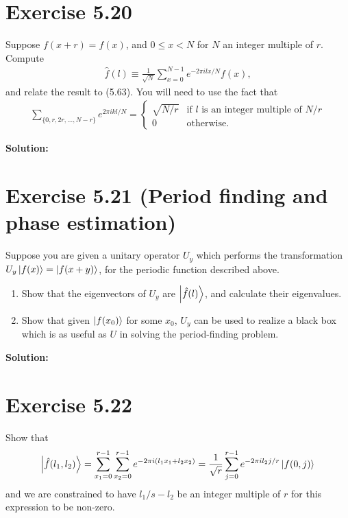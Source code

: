 \documentclass{book}
\begin{document}
\section*{Exercise 5.20}
    Suppose $f(x+r) = f(x)$, and $0\leq x<N$ for $N$ an integer multiple of $r$. Compute
    \begin{align}
        \hat{f}(l)\equiv \frac{1}{\sqrt{N}}\sum_{x=0}^{N-1} e^{-2\pi i l x/N} f(x),
    \end{align}
    and relate the result to (5.63). You will need to use the fact that
    \begin{align}
        \sum_{\{0,r,2r,...,N-r\}} e^{2\pi ikl/N} = 
        \begin{cases}
            \sqrt{N/r}  & \text{if $l$ is an integer multiple of $N/r$} \\
            0 & \text{otherwise}.
        \end{cases}
    \end{align}
    
    \textbf{Solution:}
    
\section*{Exercise 5.21 (Period finding and phase estimation)}
    Suppose you are given a unitary operator $U_y$ which performs the transformation $U_y\ket{f(x)} = \ket{f(x+y)}$, for the periodic function described above.
    \begin{enumerate}
        \item Show that the eigenvectors of $U_y$ are $\ket{\hat{f}(l)}$, and calculate their eigenvalues.
        \item Show that given $\ket{f(x_0)}$ for some $x_0$, $U_y$ can be used to realize a black box which is as useful as $U$ in solving the period-finding problem.
    \end{enumerate}
    
    \textbf{Solution:}
    
\section*{Exercise 5.22}
    Show that
    \begin{align}
        \ket{\hat{f}(l_1,l_2)} = \sum_{x_1=0}^{r-1} \sum_{x_2 = 0}^{r-1}e^{-2\pi i(l_1x_1+l_2x_2)} = \frac{1}{\sqrt{r}} \sum_{j=0}^{r-1}e^{-2\pi i l_2 j /r}\ket{f(0,j)}
    \end{align}
    and we are constrained to have $l_1/s-l_2$ be an integer multiple of $r$ for this expression to be non-zero.
    
\end{document}
